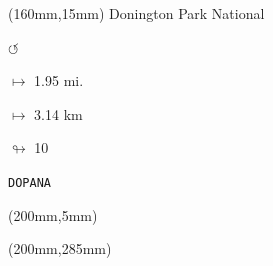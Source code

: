 \begin{textblock*}{40mm}(160mm,15mm)%
Donington Park National
\par \Huge$\circlearrowleft$
\Large
\par$\mapsto$ 1.95 mi.
\par$\mapsto$ 3.14 km
\par$\looparrowright$ 10
\par\hfill\tiny\tt DOPANA\\
\end{textblock*}
\begin{textblock*}{20mm}(200mm,5mm)%
\fbox{\thepage}
\end{textblock*}
\begin{textblock*}{20mm}(200mm,285mm)%
\fbox{\thepage}
\end{textblock*}
\null\newpage

